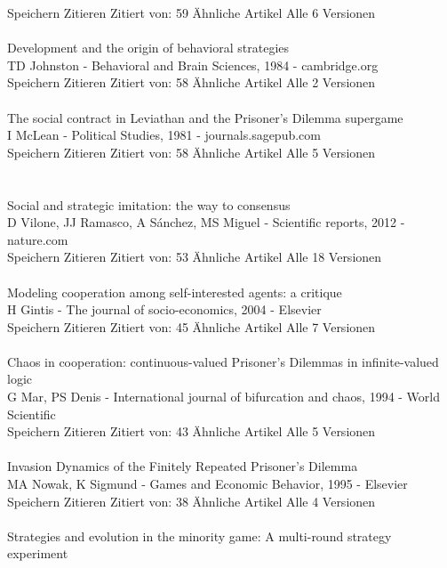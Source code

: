 \documentclass[11pt]{article}
\begin{document}
Speichern Zitieren Zitiert von: 59 Ähnliche Artikel Alle 6 Versionen\\
\\
\noindent 
Development and the origin of behavioral strategies\\
TD Johnston - Behavioral and Brain Sciences, 1984 - cambridge.org\\
Speichern Zitieren Zitiert von: 58 Ähnliche Artikel Alle 2 Versionen\\
\\
\noindent 
The social contract in Leviathan and the Prisoner's Dilemma supergame\\
I McLean - Political Studies, 1981 - journals.sagepub.com\\
Speichern Zitieren Zitiert von: 58 Ähnliche Artikel Alle 5 Versionen\\
\\
\\
\noindent 
Social and strategic imitation: the way to consensus\\
D Vilone, JJ Ramasco, A Sánchez, MS Miguel - Scientific reports, 2012 - nature.com\\
Speichern Zitieren Zitiert von: 53 Ähnliche Artikel Alle 18 Versionen\\
\\
\noindent 
[HTML] Modeling cooperation among self-interested agents: a critique\\
H Gintis - The journal of socio-economics, 2004 - Elsevier\\
Speichern Zitieren Zitiert von: 45 Ähnliche Artikel Alle 7 Versionen\\
\\
\noindent 
Chaos in cooperation: continuous-valued Prisoner's Dilemmas in infinite-valued logic\\
G Mar, PS Denis - International journal of bifurcation and chaos, 1994 - World Scientific\\
Speichern Zitieren Zitiert von: 43 Ähnliche Artikel Alle 5 Versionen\\
\\
\noindent 
Invasion Dynamics of the Finitely Repeated Prisoner's Dilemma\\
MA Nowak, K Sigmund - Games and Economic Behavior, 1995 - Elsevier\\
Speichern Zitieren Zitiert von: 38 Ähnliche Artikel Alle 4 Versionen\\
\\
\noindent 
[HTML] Strategies and evolution in the minority game: A multi-round strategy experiment\\
\end{document}
